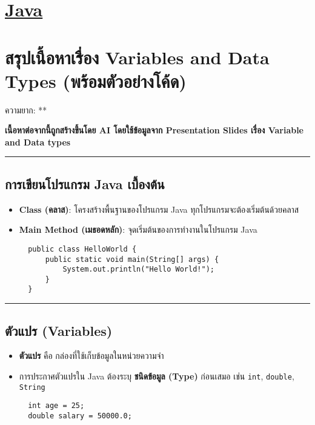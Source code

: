\documentclass[11pt]{article}
\date{\today}
\title{}
\begin{document}
\tableofcontents

\section{\href{./index.org}{\textbf{Java}}}
\label{sec:org7645b69}
\section{สรุปเนื้อหาเรื่อง Variables and Data Types (พร้อมตัวอย่างโค้ด)}
\label{sec:org04ab3fc}
ความยาก: **

\textbf{เนื้อหาต่อจากนี้ถูกสร้างขึ้นโดย AI โดยใช้ข้อมูลจาก Presentation Slides เรื่อง Variable and Data types}

\noindent\rule{\textwidth}{0.5pt}
\subsection{การเขียนโปรแกรม Java เบื้องต้น}
\label{sec:orgabdad72}
\begin{itemize}
\item \textbf{Class (คลาส)}: โครงสร้างพื้นฐานของโปรแกรม Java
ทุกโปรแกรมจะต้องเริ่มต้นด้วยคลาส

\item \textbf{Main Method (เมธอดหลัก)}: จุดเริ่มต้นของการทำงานในโปรแกรม Java

\begin{verbatim}
  public class HelloWorld {
      public static void main(String[] args) {
          System.out.println("Hello World!");
      }
  }
\end{verbatim}
\end{itemize}

\noindent\rule{\textwidth}{0.5pt}
\subsection{ตัวแปร (Variables)}
\label{sec:org6b18202}
\begin{itemize}
\item \textbf{ตัวแปร} คือ กล่องที่ใช้เก็บข้อมูลในหน่วยความจำ

\item การประกาศตัวแปรใน Java ต้องระบุ \textbf{ชนิดข้อมูล (Type)} ก่อนเสมอ เช่น \texttt{int},
\texttt{double}, \texttt{String}

\begin{verbatim}
  int age = 25;
  double salary = 50000.0;
\end{verbatim}
\end{itemize}
\end{document}
